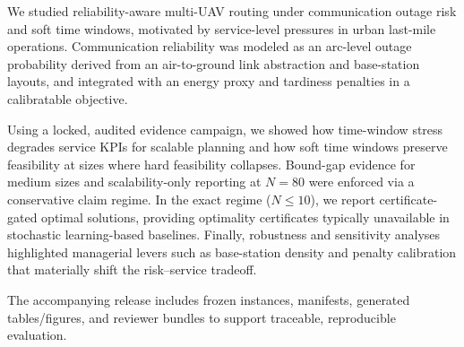 We studied reliability-aware multi-UAV routing under communication outage risk and soft time windows, motivated by service-level pressures in urban last-mile operations. Communication reliability was modeled as an arc-level outage probability derived from an air-to-ground link abstraction and base-station layouts, and integrated with an energy proxy and tardiness penalties in a calibratable objective.

Using a locked, audited evidence campaign, we showed how time-window stress degrades service KPIs for scalable planning and how soft time windows preserve feasibility at sizes where hard feasibility collapses. Bound-gap evidence for medium sizes and scalability-only reporting at $N=80$ were enforced via a conservative claim regime. In the exact regime ($N\le 10$), we report certificate-gated optimal solutions, providing optimality certificates typically unavailable in stochastic learning-based baselines. Finally, robustness and sensitivity analyses highlighted managerial levers such as base-station density and penalty calibration that materially shift the risk--service tradeoff.

The accompanying release includes frozen instances, manifests, generated tables/figures, and reviewer bundles to support traceable, reproducible evaluation.
